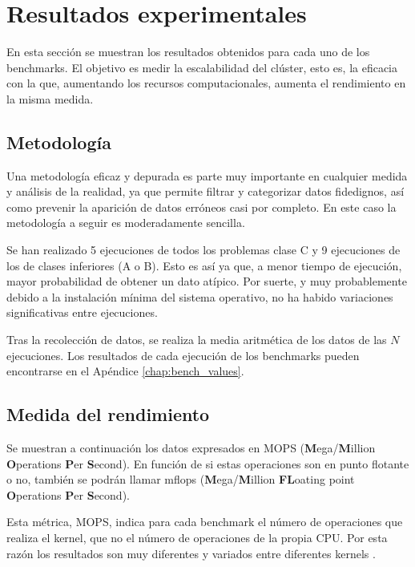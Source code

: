 \section{Resultados experimentales}
\label{sec:medida_rendimiento}
En esta sección se muestran los resultados obtenidos para cada uno de los benchmarks. El objetivo es medir la escalabilidad del clúster, esto es, la eficacia con la que, aumentando los recursos computacionales, aumenta el rendimiento en la misma medida.

\subsection{Metodología}
\label{ssec:medida_rendimiento_metodologia}
Una metodología eficaz y depurada es parte muy importante en cualquier medida y análisis de la realidad, ya que permite filtrar y categorizar datos fidedignos, así como prevenir la aparición de datos erróneos casi por completo. En este caso la metodología a seguir es moderadamente sencilla.

Se han realizado 5 ejecuciones de todos los problemas clase C y 9 ejecuciones de los de clases inferiores (A o B). Esto es así ya que, a menor tiempo de ejecución, mayor probabilidad de obtener un dato atípico. Por suerte, y muy probablemente debido a la instalación mínima del sistema operativo, no ha habido variaciones significativas entre ejecuciones.

Tras la recolección de datos, se realiza la media aritmética de los datos de las $N$ ejecuciones. Los resultados de cada ejecución de los benchmarks pueden encontrarse en el Apéndice \ref{chap:bench_values}.

\subsection{Medida del rendimiento}
Se muestran a continuación los datos expresados en MOPS (\textbf{M}ega/\textbf{M}illion \textbf{O}perations \textbf{P}er \textbf{S}econd). En función de si estas operaciones son en punto flotante o no, también se podrán llamar \acrshort{mflops} (\textbf{M}ega/\textbf{M}illion \textbf{FL}oating point \textbf{O}perations \textbf{P}er \textbf{S}econd).

Esta métrica, MOPS, indica para cada benchmark el número de operaciones que realiza el kernel, que no el número de operaciones de la propia CPU. Por esta razón los resultados son muy diferentes y variados entre diferentes kernels \cite{mallon2009npb}.

